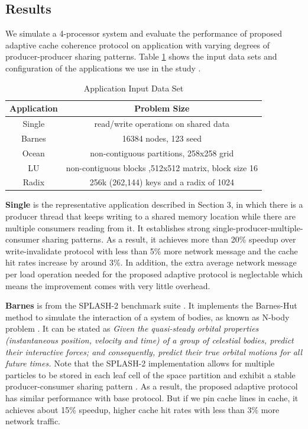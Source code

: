\documentclass[conference]{IEEEtran}
\begin{document}
\subsection{Results}
We simulate a 4-processor system and evaluate the performance of proposed adaptive cache coherence protocol on application with varying degrees of producer-producer sharing patterns. Table \ref{app} shows the input data sets and configuration of the applications we use in the study \cite{splash}.

\begin{table}[!h]
\renewcommand{\arraystretch}{2.5}
\caption{Application Input Data Set}
\label{app}
\centering
\begin{tabular}{|c|c|}
\hline
Application & Problem Size\\
\hline
Single & read/write operations on shared data\\
\hline
Barnes & 16384 nodes, 123 seed\\
\hline
Ocean & non-contiguous partitions, 258x258 grid\\
\hline
LU & non-contiguous blocks ,512x512 matrix, block size 16\\
\hline
Radix & 256k (262,144) keys and a radix of 1024\\
\hline
\end{tabular}
\end{table}
\FloatBarrier

\textbf{Single} is the representative application described in Section 3, in which there is a producer thread that keeps writing to a shared memory location while there are multiple consumers reading from it. It establishes strong single-producer-multiple-consumer sharing patterns. As a result, it achieves more than 20\% speedup over write-invalidate protocol with less than 5\% more network message and the cache hit rates increase by around 3\%. In addition, the extra average network message per load operation needed for the proposed adaptive protocol is neglectable which means the improvement comes with very little overhead.

\textbf{Barnes} is from the SPLASH-2 benchmark suite \cite{splash}. It implements the Barnes-Hut method to simulate the interaction of a system of bodies, as known as N-body problem \cite{nbody}. It can be stated as \textit{Given the quasi-steady orbital properties (instantaneous position, velocity and time) of a group of celestial bodies, predict their interactive forces; and consequently, predict their true orbital motions for all future times. \cite{nbody_wiki}} Note that the SPLASH-2 implementation allows for multiple particles to be stored in each leaf cell of the space partition and exhibit a stable producer-consumer sharing pattern \cite{barnes}. As a result, the proposed adaptive protocol has similar performance with base protocol. But if we pin cache lines in cache, it achieves about 15\% speedup, higher cache hit rates with less than 3\% more network traffic.
\end{document}
